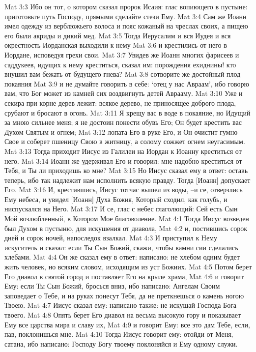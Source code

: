 Mat 3:3  Ибо он тот, о котором сказал пророк Исаия: глас вопиющего в пустыне: приготовьте путь Господу, прямыми сделайте стези Ему.
Mat 3:4  Сам же Иоанн имел одежду из верблюжьего волоса и пояс кожаный на чреслах своих, а пищею его были акриды и дикий мед.
Mat 3:5  Тогда Иерусалим и вся Иудея и вся окрестность Иорданская выходили к нему
Mat 3:6  и крестились от него в Иордане, исповедуя грехи свои.
Mat 3:7  Увидев же Иоанн многих фарисеев и саддукеев, идущих к нему креститься, сказал им: порождения ехиднины! кто внушил вам бежать от будущего гнева?
Mat 3:8  сотворите же достойный плод покаяния
Mat 3:9  и не думайте говорить в себе: `отец у нас Авраам', ибо говорю вам, что Бог может из камней сих воздвигнуть детей Аврааму.
Mat 3:10  Уже и секира при корне дерев лежит: всякое дерево, не приносящее доброго плода, срубают и бросают в огонь.
Mat 3:11  Я крещу вас в воде в покаяние, но Идущий за мною сильнее меня; я не достоин понести обувь Его; Он будет крестить вас Духом Святым и огнем;
Mat 3:12  лопата Его в руке Его, и Он очистит гумно Свое и соберет пшеницу Свою в житницу, а солому сожжет огнем неугасимым.
Mat 3:13  Тогда приходит Иисус из Галилеи на Иордан к Иоанну креститься от него.
Mat 3:14  Иоанн же удерживал Его и говорил: мне надобно креститься от Тебя, и Ты ли приходишь ко мне?
Mat 3:15  Но Иисус сказал ему в ответ: оставь теперь, ибо так надлежит нам исполнить всякую правду. Тогда [Иоанн] допускает Его.
Mat 3:16  И, крестившись, Иисус тотчас вышел из воды, --и се, отверзлись Ему небеса, и увидел [Иоанн] Духа Божия, Который сходил, как голубь, и ниспускался на Него.
Mat 3:17  И се, глас с небес глаголющий: Сей есть Сын Мой возлюбленный, в Котором Мое благоволение.
Mat 4:1  Тогда Иисус возведен был Духом в пустыню, для искушения от диавола,
Mat 4:2  и, постившись сорок дней и сорок ночей, напоследок взалкал.
Mat 4:3  И приступил к Нему искуситель и сказал: если Ты Сын Божий, скажи, чтобы камни сии сделались хлебами.
Mat 4:4  Он же сказал ему в ответ: написано: не хлебом одним будет жить человек, но всяким словом, исходящим из уст Божиих.
Mat 4:5  Потом берет Его диавол в святой город и поставляет Его на крыле храма,
Mat 4:6  и говорит Ему: если Ты Сын Божий, бросься вниз, ибо написано: Ангелам Своим заповедает о Тебе, и на руках понесут Тебя, да не преткнешься о камень ногою Твоею.
Mat 4:7  Иисус сказал ему: написано также: не искушай Господа Бога твоего.
Mat 4:8  Опять берет Его диавол на весьма высокую гору и показывает Ему все царства мира и славу их,
Mat 4:9  и говорит Ему: все это дам Тебе, если, пав, поклонишься мне.
Mat 4:10  Тогда Иисус говорит ему: отойди от Меня, сатана, ибо написано: Господу Богу твоему поклоняйся и Ему одному служи.
